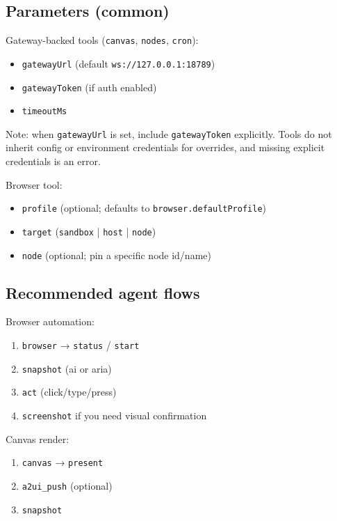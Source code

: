 \subsection{Parameters (common)}


Gateway-backed tools (\texttt{canvas}, \texttt{nodes}, \texttt{cron}):

\begin{itemize}
  \item \texttt{gatewayUrl} (default \texttt{ws://127.0.0.1:18789})
  \item \texttt{gatewayToken} (if auth enabled)
  \item \texttt{timeoutMs}
\end{itemize}


Note: when \texttt{gatewayUrl} is set, include \texttt{gatewayToken} explicitly. Tools do not inherit config
or environment credentials for overrides, and missing explicit credentials is an error.

Browser tool:

\begin{itemize}
  \item \texttt{profile} (optional; defaults to \texttt{browser.defaultProfile})
  \item \texttt{target} (\texttt{sandbox} | \texttt{host} | \texttt{node})
  \item \texttt{node} (optional; pin a specific node id/name)
\end{itemize}


\subsection{Recommended agent flows}


Browser automation:

\begin{enumerate}
  \item \texttt{browser} → \texttt{status} / \texttt{start}
  \item \texttt{snapshot} (ai or aria)
  \item \texttt{act} (click/type/press)
  \item \texttt{screenshot} if you need visual confirmation
\end{enumerate}


Canvas render:

\begin{enumerate}
  \item \texttt{canvas} → \texttt{present}
  \item \texttt{a2ui\_push} (optional)
  \item \texttt{snapshot}
\end{enumerate}


